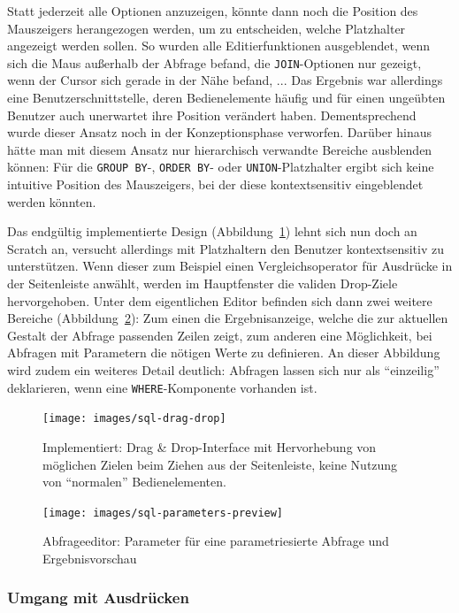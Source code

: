 Statt jederzeit alle Optionen anzuzeigen, könnte dann noch die Position des Mauszeigers herangezogen werden, um zu entscheiden, welche Platzhalter angezeigt werden sollen. So wurden alle Editierfunktionen ausgeblendet, wenn sich die Maus außerhalb der Abfrage befand, die \texttt{JOIN}-Optionen nur gezeigt, wenn der Cursor sich gerade in der Nähe befand, ... Das Ergebnis war allerdings eine Benutzerschnittstelle, deren Bedienelemente häufig und für einen ungeübten Benutzer auch unerwartet ihre Position verändert haben. Dementsprechend wurde dieser Ansatz noch in der Konzeptionsphase verworfen. Darüber hinaus hätte man mit diesem Ansatz nur hierarchisch verwandte Bereiche ausblenden können: Für die \texttt{GROUP BY}-, \texttt{ORDER BY}- oder \texttt{UNION}-Platzhalter ergibt sich keine intuitive Position des Mauszeigers, bei der diese kontextsensitiv eingeblendet werden könnten.

Das endgültig implementierte Design (Abbildung~\ref{fig:screen-sql-editor-drag-drop}) lehnt sich nun doch an Scratch an, versucht allerdings mit Platzhaltern den Benutzer kontextsensitiv zu unterstützen. Wenn dieser zum Beispiel einen Vergleichsoperator für Ausdrücke in der Seitenleiste anwählt, werden im Hauptfenster die validen Drop-Ziele hervorgehoben. Unter dem eigentlichen Editor befinden sich dann zwei weitere Bereiche (Abbildung~\ref{fig:screen-sql-editor-parameters-preview}): Zum einen die Ergebnisanzeige, welche die zur aktuellen Gestalt der Abfrage passenden Zeilen zeigt, zum anderen eine Möglichkeit, bei Abfragen mit Parametern die nötigen Werte zu definieren. An dieser Abbildung wird zudem ein weiteres Detail deutlich: Abfragen lassen sich nur als "`einzeilig"' deklarieren, wenn eine \texttt{WHERE}-Komponente vorhanden ist.

\begin{figure}[h]
  \texttt{[image: images/sql-drag-drop]}
  \caption{Implementiert: Drag \& Drop-Interface mit Hervorhebung von möglichen Zielen beim Ziehen aus der Seitenleiste, keine Nutzung von "`normalen"' Bedienelementen.}
  \label{fig:screen-sql-editor-drag-drop}
\end{figure}

\begin{figure}[p]
  \texttt{[image: images/sql-parameters-preview]}
  \caption{Abfrageeditor: Parameter für eine parametriesierte Abfrage und Ergebnisvorschau}
  \label{fig:screen-sql-editor-parameters-preview}
\end{figure}

\subsubsection{Umgang mit Ausdrücken}

